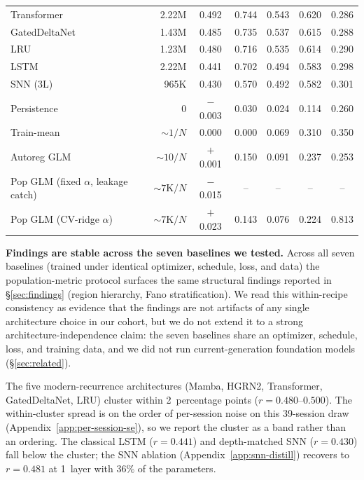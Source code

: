 \documentclass{article}
\begin{document}
\begin{table}[!ht]
\begin{tabular}{@{} l r c c c c c @{}}
    Transformer
      & 2.22M & 0.492 & 0.744 & 0.543 & 0.620 & 0.286 \\
    GatedDeltaNet
      & 1.43M & 0.485 & 0.735 & 0.537 & 0.615 & 0.288 \\
    LRU
      & 1.23M & 0.480 & 0.716 & 0.535 & 0.614 & 0.290 \\
    LSTM
      & 2.22M & 0.441 & 0.702 & 0.494 & 0.583 & 0.298 \\
    SNN (3L)
      & 965K  & 0.430 & 0.570 & 0.492 & 0.582 & 0.301 \\
    \midrule
    Persistence
      & 0     & $-$0.003 & 0.030 & 0.024 & 0.114 & 0.260 \\
    Train-mean
      & ${\sim}1/N$ & 0.000 & 0.000 & 0.069 & 0.310 & 0.350 \\
    Autoreg GLM
      & ${\sim}10/N$   & $+$0.001 & 0.150 & 0.091 & 0.237 & 0.253 \\
    Pop GLM (fixed $\alpha$, leakage catch)
      & ${\sim}7\mathrm{K}/N$ & $-$0.015 & -- & -- & -- & -- \\
    Pop GLM (CV-ridge $\alpha$)
      & ${\sim}7\mathrm{K}/N$ & $+$0.023 & 0.143 & 0.076 & 0.224 & 0.813 \\
    \bottomrule
  \end{tabular}
\end{table}


\textbf{Findings are stable across the seven baselines we tested.}
Across all seven baselines (trained under identical optimizer,
schedule, loss, and data) the population-metric protocol surfaces
the same structural findings reported in \S\ref{sec:findings} (region
hierarchy, Fano stratification).  We
read this within-recipe consistency as evidence that the findings are
not artifacts of any single architecture choice in our cohort, but we
do not extend it to a strong architecture-independence claim: the
seven baselines share an optimizer, schedule, loss, and training
data, and we did not run current-generation foundation models
(\S\ref{sec:related}).

The five modern-recurrence architectures (Mamba, HGRN2, Transformer,
GatedDeltaNet, LRU) cluster within 2~percentage points
($r{=}0.480\text{--}0.500$).  The within-cluster spread is on the
order of per-session noise on this 39-session draw
(Appendix~\ref{app:per-session-se}), so we report the cluster as a
band rather than an ordering.  The classical LSTM ($r{=}0.441$) and
depth-matched SNN ($r{=}0.430$) fall below the cluster; the SNN
ablation (Appendix~\ref{app:snn-distill}) recovers to $r{=}0.481$ at
1~layer with $36\%$ of the parameters.
\end{document}
